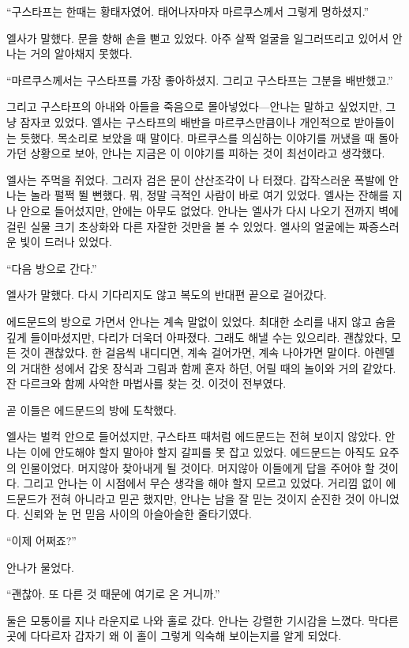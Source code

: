 ``구스타프는 한때는 황태자였어. 태어나자마자 마르쿠스께서 그렇게 명하셨지.''

엘사가 말했다. 문을 향해 손을 뻗고 있었다. 아주 살짝 얼굴을 일그러뜨리고 있어서 안나는 거의 알아채지 못했다.

``마르쿠스께서는 구스타프를 가장 좋아하셨지. 그리고 구스타프는 그분을 배반했고.''

그리고 구스타프의 아내와 아들을 죽음으로 몰아넣었다—안나는 말하고 싶었지만, 그냥 잠자코 있었다. 엘사는 구스타프의 배반을 마르쿠스만큼이나 개인적으로 받아들이는 듯했다. 목소리로 보았을 때 말이다. 마르쿠스를 의심하는 이야기를 꺼냈을 때 돌아가던 상황으로 보아, 안나는 지금은 이 이야기를 피하는 것이 최선이라고 생각했다.

엘사는 주먹을 쥐었다. 그러자 검은 문이 산산조각이 나 터졌다. 갑작스러운 폭발에 안나는 놀라 펄쩍 뛸 뻔했다. 뭐, 정말 극적인 사람이 바로 여기 있었다. 엘사는 잔해를 지나 안으로 들어섰지만, 안에는 아무도 없었다. 안나는 엘사가 다시 나오기 전까지 벽에 걸린 실물 크기 초상화와 다른 자잘한 것만을 볼 수 있었다. 엘사의 얼굴에는 짜증스러운 빛이 드러나 있었다.

``다음 방으로 간다.''

엘사가 말했다. 다시 기다리지도 않고 복도의 반대편 끝으로 걸어갔다.

에드문드의 방으로 가면서 안나는 계속 말없이 있었다. 최대한 소리를 내지 않고 숨을 깊게 들이마셨지만, 다리가 더욱더 아파졌다. 그래도 해낼 수는 있으리라. 괜찮았다, 모든 것이 괜찮았다. 한 걸음씩 내디디면, 계속 걸어가면, 계속 나아가면 말이다. 아렌델의 거대한 성에서 갑옷 장식과 그림과 함께 혼자 하던, 어릴 때의 놀이와 거의 같았다. 잔 다르크와 함께 사악한 마법사를 찾는 것. 이것이 전부였다.

곧 이들은 에드문드의 방에 도착했다.

엘사는 벌컥 안으로 들어섰지만, 구스타프 때처럼 에드문드는 전혀 보이지 않았다. 안나는 이에 안도해야 할지 말아야 할지 갈피를 못 잡고 있었다. 에드문드는 아직도 요주의 인물이었다. 머지않아 찾아내게 될 것이다. 머지않아 이들에게 답을 주어야 할 것이다. 그리고 안나는 이 시점에서 무슨 생각을 해야 할지 모르고 있었다. 거리낌 없이 에드문드가 전혀 아니라고 믿곤 했지만, 안나는 남을 잘 믿는 것이지 순진한 것이 아니었다. 신뢰와 눈 먼 믿음 사이의 아슬아슬한 줄타기였다.

``이제 어쩌죠?''

안나가 물었다.

``괜찮아. 또 다른 것 때문에 여기로 온 거니까.''

둘은 모퉁이를 지나 라운지로 나와 홀로 갔다. 안나는 강렬한 기시감을 느꼈다. 막다른 곳에 다다르자 갑자기 왜 이 홀이 그렇게 익숙해 보이는지를 알게 되었다.

